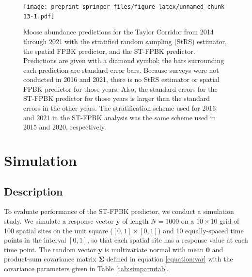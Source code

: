 \documentclass[smallextended]{svjour3}       %
\begin{document}
\begin{figure}
\centering
\texttt{[image: preprint\_springer\_files/figure-latex/unnamed-chunk-13-1.pdf]}
\caption{\label{fig:trend} Moose abundance predictions for the Taylor
Corridor from 2014 through 2021 with the stratified random sampling
(StRS) estimator, the spatial FPBK predictor, and the ST-FPBK predictor.
Predictions are given with a diamond symbol; the bars surrounding each
prediction are standard error bars. Because surveys were not conducted
in 2016 and 2021, there is no StRS estimator or spatial FPBK predictor
for those years. Also, the standard errors for the ST-FPBK predictor for
those years is larger than the standard errors in the other years. The
stratification scheme used for 2016 and 2021 in the ST-FPBK analysis was
the same scheme used in 2015 and 2020, respectively.}
\end{figure}

\hypertarget{section:Simulation}{%
\section{Simulation}\label{section:Simulation}}

\hypertarget{description}{%
\subsection{Description}\label{description}}

To evaluate performance of the ST-FPBK predictor, we conduct a
simulation study. We simulate a response vector \(\mathbf{y}\) of length
\(N = 1000\) on a \(10 \times 10\) grid of 100 spatial sites on the unit
square (\([0, 1] \times [0, 1]\)) and 10 equally-spaced time points in
the interval \([0, 1]\), so that each spatial site has a response value
at each time point. The random vector \(\mathbf{y}\) is multivariate
normal with mean \(\mathbf{0}\) and product-sum covariance matrix
\(\bm{\Sigma}\) defined in equation \ref{equation:var} with the
covariance parameters given in Table \ref{tab:simparmtab}.
\end{document}
